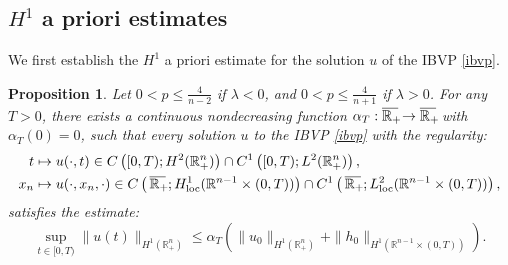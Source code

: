 \documentclass[preprint,compress,12pt]{elsarticle}
\newtheorem{proposition}[theorem]{Proposition}
\numberwithin{equation}{section}
\begin{document}
\subsection{$H^{1}$ a priori estimates}\label{sec41}
We first establish the $H^{1}$ a priori estimate for the solution $u$ of the IBVP \eqref{ibvp}.
\begin{proposition}\label{maritime}
	Let $0 < p \leq \frac{4}{n-2}$ if $\lambda < 0$, and $0 < p \leq \frac{4}{n+1}$ if $\lambda > 0$. For any $T>0$, there exists a continuous nondecreasing function $\alpha_T : \overline{\mathbb{R}_{+}\mkern-4mu} \to \overline{\mathbb{R}_{+}\mkern-4mu}$ with $\alpha_T(0) = 0$, such that every solution $u$ to the IBVP \eqref{ibvp} with the regularity:
	\begin{align}
		t&\mapsto u(\cdot,t) \in C\left([0,T);H^{2}(\mathbb{R}^{n}_{+})\right)\cap C^{1}\left([0,T);L^{2}(\mathbb{R}^{n}_{+})\right), \label{reg} \\
		x_{n}&\mapsto u(\cdot,x_{n},\cdot) \in C\left(\,\overline{\mathbb{R}_{+}\mkern-4mu}\,;{H}_{\mathrm{loc}}^{1}(\mathbb{R}^{n-1}\times(0,T))\right)\cap C^{1}\left(\,\overline{\mathbb{R}_{+}\mkern-4mu}\,;{L}_{\mathrm{loc}}^{2}(\mathbb{R}^{n-1}\times(0,T))\right),\label{reg1}
	\end{align}
	satisfies the estimate:
	\begin{equation}\label{drone}
		\sup_{t \in [0,T)} \|u(t)\|_{H^1(\mathbb{R}^n_+)} \leq\alpha_T \left( \|u_0\|_{H^1(\mathbb{R}^n_+)} + \|h_0\|_{H^1(\mathbb{R}^{n-1} \times (0,T))} \right).
	\end{equation}
\end{proposition}
\end{document}
